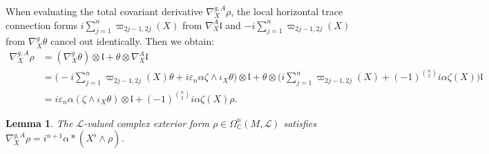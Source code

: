 \documentclass[10pt,a4paper,twoside,reqno]{amsart}
\theoremstyle{plain}
\newtheorem{lemma}[thm]{Lemma}
\theoremstyle{definition}
\theoremstyle{remark}
\def\C{\mathbb{C}}
\begin{document}
\noindent
When evaluating the total covariant derivative $\nabla^{g,A}_X \rho$, the local horizontal trace connection forms $i\sum_{j=1}^n \varpi_{2j-1, 2j}(X)$ from $\nabla^A_X \mathfrak{l}$ and $-i\sum_{j=1}^n \varpi_{2j-1, 2j}(X)$ from $\nabla^g_X \theta$ cancel out identically. Then we obtain:
\begin{align*}
\nabla^{g,A}_X\rho&=(\nabla^g_X\theta)\otimes\mathfrak{l}+\theta\otimes\nabla^A_X\mathfrak{l}\\
&=\Big(-i\sum_{j=1}^n\varpi_{2j-1,2j}(X)\theta+i\varepsilon_n\alpha\zeta\wedge\iota_X\theta\Big)\otimes\mathfrak{l}+\theta\otimes\Big(i\sum_{j=1}^n\varpi_{2j-1,2j}(X)+(-1)^{\binom{n}{2}}i\alpha\zeta(X)\Big)\mathfrak{l}\\
&=i\varepsilon_n\alpha(\zeta\wedge\iota_X\theta)\otimes\mathfrak{l}+(-1)^{\binom{n}{2}}i\alpha\zeta(X)\rho.
\end{align*}

\begin{lemma}
The $\mathcal{L}$-valued complex exterior form $\rho\in\Omega^n_\C(M,\mathcal{L})$ satisfies $\nabla^{g,A}_X \rho = i^{n+1}\alpha \ast (X^\flat \wedge \rho)$.
\end{lemma}
\end{document}
